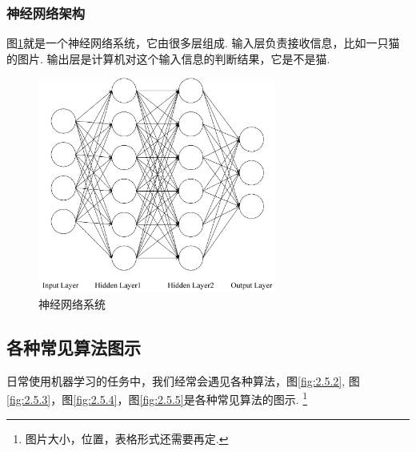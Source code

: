 \subsubsection{神经网络架构}
图\ref{fig:2.5.1}就是一个神经网络系统，它由很多层组成.
输入层负责接收信息，比如一只猫的图片.
输出层是计算机对这个输入信息的判断结果，它是不是猫.

\begin{figure}
  \centering
  \includegraphics[width=0.7\textwidth]{./img/ch2/mao.png}
  \caption{神经网络系统}
  \label{fig:2.5.1}
\end{figure}

\subsection{各种常见算法图示}
\label{ux5404ux79cdux5e38ux89c1ux7b97ux6cd5ux56feux793a}
日常使用机器学习的任务中，我们经常会遇见各种算法，图\ref{fig:2.5.2},
图\ref{fig:2.5.3}，图\ref{fig:2.5.4}，图\ref{fig:2.5.5}是各种常见算法的图示.
\footnote{图片大小，位置，表格形式还需要再定.}


